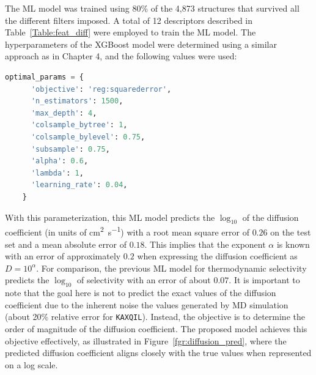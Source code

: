 \documentclass[main]{subfiles}
\begin{document}
The ML model was trained using {80\%} of the 4,873 structures that survived all the different filters imposed. A total of 12 descriptors described in Table~\ref{Table:feat_diff} were employed to train the ML model. The hyperparameters of the XGBoost model were determined using a similar approach as in Chapter 4, and the following values were used:

\begin{lstlisting}[language=Python]
  optimal_params = {
      'objective': 'reg:squarederror',
      'n_estimators': 1500,
      'max_depth': 4,
      'colsample_bytree': 1,
      'colsample_bylevel': 0.75,
      'subsample': 0.75,
      'alpha': 0.6,
      'lambda': 1,
      'learning_rate': 0.04,
    }
\end{lstlisting}

With this parameterization, this ML model predicts the $\log_{10}$ of the diffusion coefficient (in units of \si{\square\cm\per\s}) with a root mean square error of $0.26$ on the test set and a mean absolute error of $0.18$. This implies that the exponent $\alpha$ is known with an error of approximately $0.2$ when expressing the diffusion coefficient as $D = 10^{\alpha}$. For comparison, the previous ML model for thermodynamic selectivity predicts the $\log_{10}$ of selectivity with an error of about $0.07$. It is important to note that the goal here is not to predict the exact values of the diffusion coefficient due to the inherent noise the values generated by MD simulation (about {20\% relative error for \texttt{KAXQIL}}). Instead, the objective is to determine the order of magnitude of the diffusion coefficient. The proposed model achieves this objective effectively, as illustrated in Figure~\ref{fgr:diffusion_pred}, where the predicted diffusion coefficient aligns closely with the true values when represented on a log scale.
\end{document}
